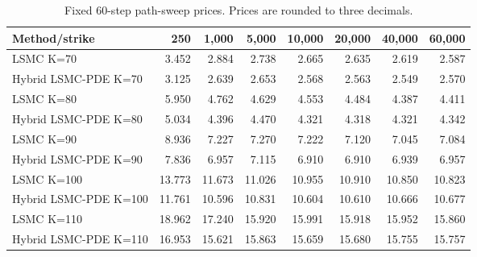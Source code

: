 \begin{table}[htbp]\centering
\caption{Fixed 60-step path-sweep prices. Prices are rounded to three decimals.}
\begin{tabular}{lrrrrrrr}
\toprule
Method/strike & 250 & 1,000 & 5,000 & 10,000 & 20,000 & 40,000 & 60,000 \\
\midrule
LSMC K=70 & 3.452 & 2.884 & 2.738 & 2.665 & 2.635 & 2.619 & 2.587 \\
Hybrid LSMC-PDE K=70 & 3.125 & 2.639 & 2.653 & 2.568 & 2.563 & 2.549 & 2.570 \\
LSMC K=80 & 5.950 & 4.762 & 4.629 & 4.553 & 4.484 & 4.387 & 4.411 \\
Hybrid LSMC-PDE K=80 & 5.034 & 4.396 & 4.470 & 4.321 & 4.318 & 4.321 & 4.342 \\
LSMC K=90 & 8.936 & 7.227 & 7.270 & 7.222 & 7.120 & 7.045 & 7.084 \\
Hybrid LSMC-PDE K=90 & 7.836 & 6.957 & 7.115 & 6.910 & 6.910 & 6.939 & 6.957 \\
LSMC K=100 & 13.773 & 11.673 & 11.026 & 10.955 & 10.910 & 10.850 & 10.823 \\
Hybrid LSMC-PDE K=100 & 11.761 & 10.596 & 10.831 & 10.604 & 10.610 & 10.666 & 10.677 \\
LSMC K=110 & 18.962 & 17.240 & 15.920 & 15.991 & 15.918 & 15.952 & 15.860 \\
Hybrid LSMC-PDE K=110 & 16.953 & 15.621 & 15.863 & 15.659 & 15.680 & 15.755 & 15.757 \\
\bottomrule
\end{tabular}
\end{table}
